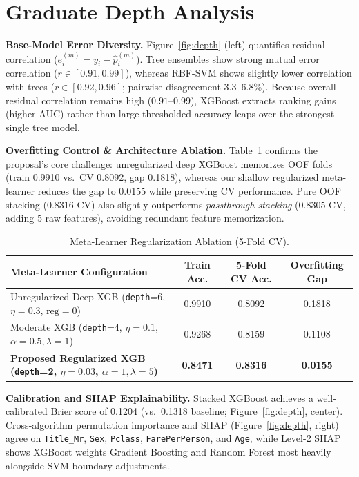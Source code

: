 \documentclass{article}
\begin{document}
\section{Graduate Depth Analysis}
\textbf{Base-Model Error Diversity.} Figure~\ref{fig:depth} (left) quantifies residual correlation ($e_i^{(m)} = y_i - \hat{p}_i^{(m)}$). Tree ensembles show strong mutual error correlation ($r \in [0.91, 0.99]$), whereas RBF-SVM shows slightly lower correlation with trees ($r \in [0.92, 0.96]$; pairwise disagreement 3.3--6.8\%). Because overall residual correlation remains high ($0.91$--$0.99$), XGBoost extracts ranking gains (higher AUC) rather than large thresholded accuracy leaps over the strongest single tree model.

\textbf{Overfitting Control \& Architecture Ablation.} Table~\ref{tab:ablation} confirms the proposal's core challenge: unregularized deep XGBoost memorizes OOF folds (train 0.9910 vs.\ CV 0.8092, gap 0.1818), whereas our shallow regularized meta-learner reduces the gap to 0.0155 while preserving CV performance. Pure OOF stacking (0.8316 CV) also slightly outperforms \textit{passthrough stacking} (0.8305 CV, adding 5 raw features), avoiding redundant feature memorization.

\begin{table}[h]
\centering
\caption{Meta-Learner Regularization Ablation (5-Fold CV).}
\label{tab:ablation}
\small
\begin{tabular}{@{}lccc@{}}
\toprule
\textbf{Meta-Learner Configuration} & \textbf{Train Acc.} & \textbf{5-Fold CV Acc.} & \textbf{Overfitting Gap} \\
\midrule
Unregularized Deep XGB (\texttt{depth}=6, $\eta=0.3$, $\text{reg}=0$) & 0.9910 & 0.8092 & 0.1818 \\
Moderate XGB (\texttt{depth}=4, $\eta=0.1$, $\alpha=0.5, \lambda=1$) & 0.9268 & 0.8159 & 0.1108 \\
\textbf{Proposed Regularized XGB (\texttt{depth}=2, $\eta=0.03$, $\alpha=1, \lambda=5$)} & \textbf{0.8471} & \textbf{0.8316} & \textbf{0.0155} \\
\bottomrule
\end{tabular}
\end{table}

\textbf{Calibration and SHAP Explainability.} Stacked XGBoost achieves a well-calibrated Brier score of 0.1204 (vs.\ 0.1318 baseline; Figure~\ref{fig:depth}, center). Cross-algorithm permutation importance and SHAP \citep{lundberg2017unified} (Figure~\ref{fig:depth}, right) agree on \texttt{Title\_Mr}, \texttt{Sex}, \texttt{Pclass}, \texttt{FarePerPerson}, and \texttt{Age}, while Level-2 SHAP shows XGBoost weights Gradient Boosting and Random Forest most heavily alongside SVM boundary adjustments.
\end{document}
